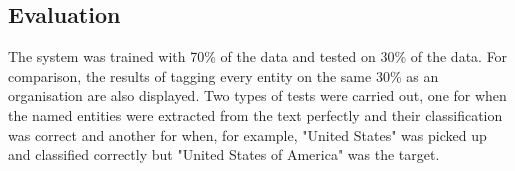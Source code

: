 \documentclass[10pt]{article}
\begin{document}
\begin{multicols}{2}
\section{Evaluation}
The system was trained with 70\% of the data and tested on 30\% of the data. For comparison, the results of tagging every entity on the same 30\% as an organisation are also displayed. Two types of tests were carried out, one for when the named entities were extracted from the text perfectly and their classification was correct and another for when, for example, "United States" was picked up and classified correctly but "United States of America" was the target.


\end{multicols}
\begin{thebibliography}{9}

\end{thebibliography}
\end{document}
